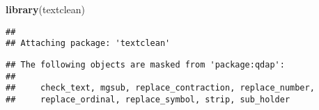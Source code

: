 \documentclass[]{article}
\newenvironment{Shaded}{\begin{snugshade}}{\end{snugshade}}
\newcommand{\KeywordTok}[1]{\textcolor[rgb]{0.13,0.29,0.53}{\textbf{#1}}}
\newcommand{\StringTok}[1]{\textcolor[rgb]{0.31,0.60,0.02}{#1}}
\newcommand{\OperatorTok}[1]{\textcolor[rgb]{0.81,0.36,0.00}{\textbf{#1}}}
\newcommand{\NormalTok}[1]{#1}
\begin{document}
\begin{Shaded}
\begin{Highlighting}[]
\KeywordTok{library}\NormalTok{(textclean)}
\end{Highlighting}
\end{Shaded}

\begin{verbatim}
## 
## Attaching package: 'textclean'
\end{verbatim}

\begin{verbatim}
## The following objects are masked from 'package:qdap':
## 
##     check_text, mgsub, replace_contraction, replace_number,
##     replace_ordinal, replace_symbol, strip, sub_holder
\end{verbatim}

\begin{Shaded}
\end{Shaded}
\end{document}
